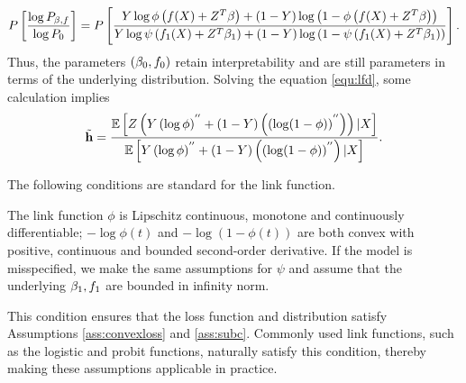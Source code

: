 $$
P\left[\frac{\log P_{\beta, f}}{\log P_0}\right]=
P\left[\frac{Y \log \phi\left(f(X ) + Z ^{T}\beta\right) + (1-Y )\log \left(1-\phi\left(f(X ) + Z^{T}\beta\right)\right)}
{Y \log \psi\left(f_{1}(X ) + Z ^{T}\beta_{1}\right) + (1-Y )\log \left(1-\psi\left(f_{1}(X ) + Z^{T}\beta_{1}\right)\right)}\right].
$$
Thus, the parameters $(\beta_{0}, f_{0})$ retain interpretability and are still parameters in terms of the underlying distribution. %
Solving the equation \eqref{equ:lfd}, some calculation implies
$$ 
\tilde{\mathbf{h}}= \frac{
\mathbb{E}\left[ Z\left(Y\left(\log \phi \right)^{''} + (1-Y)\left(
\left(\log ( 1-\phi) \right)^{''}\right)\right) |X \right]
}{
\mathbb{E}\left[Y\left(\log \phi \right)^{''} + (1-Y)\left(
\left(\log ( 1-\phi) \right)^{''}\right) |X \right]
}. 
$$

The following conditions are standard for %
the link function. 

\begin{assumption}\label{ass:clas}
%
The link function $\phi$ is Lipschitz continuous, monotone and continuously differentiable; $-\log\phi(t)$ and $-\log(1-\phi(t))$ are both convex with positive, continuous and bounded second-order derivative.
If the model is misspecified, we make the same assumptions for $\psi$ and assume that the underlying $\beta_1, f_1$ are bounded in infinity norm. 

\end{assumption}

This condition ensures that the loss function and distribution satisfy Assumptions \ref{ass:convexloss} and \ref{ass:subc}. Commonly used link functions, such as the logistic and probit functions, naturally satisfy this condition, thereby making these assumptions applicable in practice.



